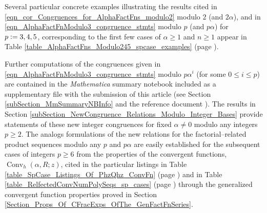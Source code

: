 \documentclass[12pt,reqno]{article}
\numberwithin{sfootnote}{section}
\newcommand{\tableref}[1]{Table \ref{#1} (page \pageref{#1})}
\numberwithin{equation}{section}
\theoremstyle{DefaultTheoremStyle}
\theoremstyle{definition}
\newcommand{\defequals}{\ensuremath{\vcentcolon=}}
\newcommand{\Mm}[0]{\emph{Mathematica}}
\newcommand{\ConvGF}[4]{\ensuremath{\Conv_{#1}\left(#2, #3; #4\right)}}
\DeclareMathOperator{\Conv}{Conv}
\begin{document}
Several particular concrete examples illustrating the 
results cited in 
\eqref{eqn_cor_Congruences_for_AlphaFactFns_modulo2} 
modulo $2$ (and $2\alpha$), and in 
\eqref{eqn_AlphaFactFnModulo3_congruence_stmts} 
modulo $p$ (and $p\alpha$) for $p \defequals 3, 4, 5$, 
corresponding to the first few cases of 
$\alpha \geq 1$ and $n \geq 1$ appear in 
\tableref{table_AlphaFactFns_Modulo245_spcase_examples}. 

Further computations of the congruences given in 
\eqref{eqn_AlphaFactFnModulo3_congruence_stmts} 
modulo $p\alpha^{i}$ (for some $0 \leq i \leq p$) are contained in the 
\Mm{} summary notebook 
included as a supplementary file with the 
submission of this article 
(see Section \ref{subSection_MmSummaryNBInfo} and the 
reference document \citep{SUMMARYNBREF-STUB}). 
The results in 
Section \ref{subSection_NewCongruence_Relations_Modulo_Integer_Bases} 
provide statements of these new integer congruences 
for fixed $\alpha \neq 0$ modulo any integers $p \geq 2$. 
The analogs formulations of 
the new relations for the factorial--related product sequences 
modulo any $p$ and $p\alpha$ 
are easily established for the subsequent cases of integers $p \geq 6$ 
from the properties of the 
convergent functions, $\ConvGF{h}{\alpha}{R}{z}$, 
cited in the particular listings in 
\tableref{table_SpCase_Listings_Of_PhzQhz_ConvFn} and in 
\tableref{table_RelfectedConvNumPolySeqs_sp_cases} 
through the generalized convergent function properties proved in 
Section \ref{Section_Props_Of_CFracExps_OfThe_GenFactFnSeries}. 
\end{document}
